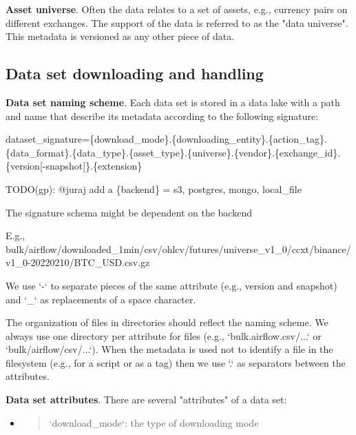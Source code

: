 \documentclass[11pt, reqno]{amsart}
\begin{document}
\textbf{Asset universe}. Often the data relates to a set of assets,
e.g., currency pairs on different exchanges. The support of the data is
referred to as the "data universe". This metadata is versioned as any
other piece of data.

\subsection{Data set downloading and handling}

\textbf{Data set naming scheme}. Each data set is stored in a data lake
with a path and name that describe its metadata according to the
following signature:

dataset\_signature=\{download\_mode\}.\{downloading\_entity\}.\{action\_tag\}.\{data\_format\}.\{data\_type\}.\{asset\_type\}.\{universe\}.\{vendor\}.\{exchange\_id\}.\{version{[}-snapshot{]}\}.\{extension\}

TODO(gp): @juraj add a \{backend\} = s3, postgres, mongo, local\_file

The signature schema might be dependent on the backend

E.g.,
bulk/airflow/downloaded\_1min/csv/ohlcv/futures/universe\_v1\_0/ccxt/binance/v1\_0-20220210/BTC\_USD.csv.gz

We use `-` to separate pieces of the same attribute (e.g., version and
snapshot) and `\_` as replacements of a space character.

The organization of files in directories should reflect the naming
scheme. We always use one directory per attribute for files (e.g.,
`bulk.airflow.csv/...` or `bulk/airflow/csv/...`). When the metadata is
used not to identify a file in the filesystem (e.g., for a script or as
a tag) then we use `.` as separators between the attributes.

\textbf{Data set attributes}. There are several "attributes" of a data
set:

\begin{itemize}
\item
  \begin{quote}
  `download\_mode`: the type of downloading mode
  \end{quote}
\end{itemize}
\end{document}
